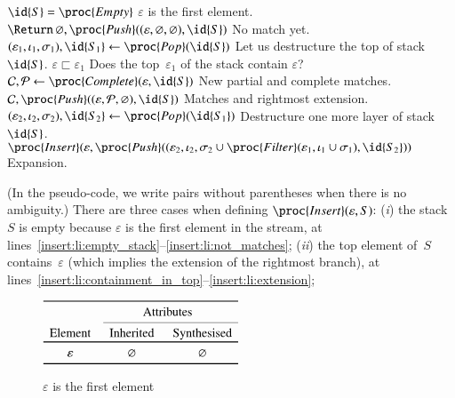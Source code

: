 \begin{codebox}
\li \If \(\id{S} = \proc{Empty}\) \label{insert:li:empty_stack}
\RComment \(\varepsilon\) is the first element.
\li \Then \(\Return \, \varnothing, \proc{Push} ((\varepsilon, \varnothing,
                        \varnothing), \id{S})\)
          \label{insert:li:not_matches}
\RComment No match yet.
\End
\li \((\varepsilon_1, \iota_1, \sigma_1), \id{S_1} 
      \gets \proc{Pop}(\id{S})\) 
    \label{insert:li:first_pop}
\RComment Let us destructure the top of stack \(\id{S}\). 
\li \If \(\varepsilon \sqsubset \varepsilon_1\)
    \label{insert:li:containment_in_top}
\RComment Does the top~\(\varepsilon_1\) of the stack contain \(\varepsilon\)?
\li \Then \({\cal C}, {\cal P} \gets \proc{Complete} (\varepsilon, \id{S})\)
    \label{insert:li:complete_stack}
\RComment New partial and complete matches.
\li \Return \({\cal C}, \proc{Push} ((\varepsilon, {\cal P},
                                          \varnothing), 
                                         \id{S})\)
    \label{insert:li:extension}
\RComment Matches and rightmost extension.
    \End
\li  \((\varepsilon_2, \iota_2, \sigma_2), \id{S_2}
       \gets \proc{Pop} (\id{S_1})\)
     \label{insert:li:second_pop}
\RComment Destructure one more layer of stack \(\id{S}\).
\li \Return \(\proc{Insert}
  (\varepsilon, 
   \proc{Push} ((\varepsilon_2,
                 \iota_2,
                 \sigma_2 \cup \proc{Filter}(\varepsilon_1, 
                                             \iota_1 \cup \sigma_1),
                \id{S_2}))\)
     \label{insert:li:expansion}
\RComment Expansion.
\end{codebox}
\noindent (In the pseudo\hyp{}code, we write pairs without parentheses
when there is no ambiguity.) There are three cases when defining
\(\proc{Insert} (\varepsilon, S)\): (\emph{i}) the stack~\(S\)
is empty because \(\varepsilon\) is the first element in the stream,
at lines~\ref{insert:li:empty_stack}--\ref{insert:li:not_matches};
(\emph{ii}) the top element of~\(S\) contains~\(\varepsilon\) (which
implies the extension of the rightmost branch), at
lines~\ref{insert:li:containment_in_top}--\ref{insert:li:extension};
\begin{figure}[b]
\centering
\(
\begin{array}{c>{\hspace*{5pt}}c>{\hspace*{5pt}}c}
\toprule
& \multicolumn{2}{c}{\text{Attributes}}\\
\cmidrule(l){2-3}
\text{Element} & \text{Inherited} & \text{Synthesised}\\
\toprule
\varepsilon & \varnothing & \varnothing\\
\bottomrule
\end{array}
\)
\caption{\(\varepsilon\) is the first element}
\label{fig:first_elem}
\end{figure}
